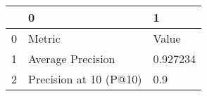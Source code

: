 \begin{tabular}{lll}
\toprule
{} &                       0 &         1 \\
\midrule
0 &                  Metric &     Value \\
1 &       Average Precision &  0.927234 \\
2 &  Precision at 10 (P@10) &       0.9 \\
\bottomrule
\end{tabular}
